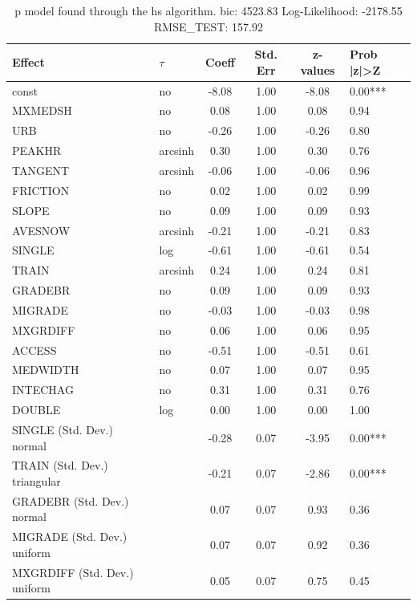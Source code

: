 \begin{table}
	\caption{p model found through the hs algorithm. bic: 4523.83 Log-Likelihood: -2178.55 RMSE_TEST: 157.92}
	\begin{center}
		\begin{tabular}{|l|l|c|c|c|l|}
			\hline
			Effect & $\tau$ & Coeff & Std. Err & z-values & Prob |z|>Z \\
			\hline
			const & no & -8.08 & 1.00 & -8.08 & 0.00*** \\
			\hline
			MXMEDSH & no & 0.08 & 1.00 & 0.08 & 0.94 \\
			\hline
			URB & no & -0.26 & 1.00 & -0.26 & 0.80 \\
			\hline
			PEAKHR & arcsinh & 0.30 & 1.00 & 0.30 & 0.76 \\
			\hline
			TANGENT & arcsinh & -0.06 & 1.00 & -0.06 & 0.96 \\
			\hline
			FRICTION & no & 0.02 & 1.00 & 0.02 & 0.99 \\
			\hline
			SLOPE & no & 0.09 & 1.00 & 0.09 & 0.93 \\
			\hline
			AVESNOW & arcsinh & -0.21 & 1.00 & -0.21 & 0.83 \\
			\hline
			SINGLE & log & -0.61 & 1.00 & -0.61 & 0.54 \\
			\hline
			TRAIN & arcsinh & 0.24 & 1.00 & 0.24 & 0.81 \\
			\hline
			GRADEBR & no & 0.09 & 1.00 & 0.09 & 0.93 \\
			\hline
			MIGRADE & no & -0.03 & 1.00 & -0.03 & 0.98 \\
			\hline
			MXGRDIFF & no & 0.06 & 1.00 & 0.06 & 0.95 \\
			\hline
			ACCESS & no & -0.51 & 1.00 & -0.51 & 0.61 \\
			\hline
			MEDWIDTH & no & 0.07 & 1.00 & 0.07 & 0.95 \\
			\hline
			INTECHAG & no & 0.31 & 1.00 & 0.31 & 0.76 \\
			\hline
			DOUBLE & log & 0.00 & 1.00 & 0.00 & 1.00 \\
			\hline
			SINGLE (Std. Dev.) normal &  & -0.28 & 0.07 & -3.95 & 0.00*** \\
			\hline
			TRAIN (Std. Dev.) triangular &  & -0.21 & 0.07 & -2.86 & 0.00*** \\
			\hline
			GRADEBR (Std. Dev.) normal &  & 0.07 & 0.07 & 0.93 & 0.36 \\
			\hline
			MIGRADE (Std. Dev.) uniform &  & 0.07 & 0.07 & 0.92 & 0.36 \\
			\hline
			MXGRDIFF (Std. Dev.) uniform &  & 0.05 & 0.07 & 0.75 & 0.45 \\

\end{tabular}
\end{center}
\end{table}
